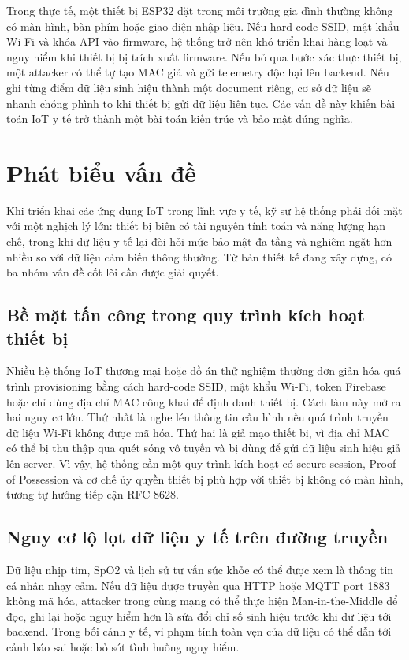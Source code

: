 \documentclass[a4paper,13pt,3p,oneside]{report}
\begin{document}
Trong thực tế, một thiết bị ESP32 đặt trong môi trường gia đình thường không có màn hình, bàn phím hoặc giao diện nhập liệu. Nếu hard-code SSID, mật khẩu Wi-Fi và khóa API vào firmware, hệ thống trở nên khó triển khai hàng loạt và nguy hiểm khi thiết bị bị trích xuất firmware. Nếu bỏ qua bước xác thực thiết bị, một attacker có thể tự tạo MAC giả và gửi telemetry độc hại lên backend. Nếu ghi từng điểm dữ liệu sinh hiệu thành một document riêng, cơ sở dữ liệu sẽ nhanh chóng phình to khi thiết bị gửi dữ liệu liên tục. Các vấn đề này khiến bài toán IoT y tế trở thành một bài toán kiến trúc và bảo mật đúng nghĩa.

\section{Phát biểu vấn đề}
Khi triển khai các ứng dụng IoT trong lĩnh vực y tế, kỹ sư hệ thống phải đối mặt với một nghịch lý lớn: thiết bị biên có tài nguyên tính toán và năng lượng hạn chế, trong khi dữ liệu y tế lại đòi hỏi mức bảo mật đa tầng và nghiêm ngặt hơn nhiều so với dữ liệu cảm biến thông thường. Từ bản thiết kế đang xây dựng, có ba nhóm vấn đề cốt lõi cần được giải quyết.

\subsection{Bề mặt tấn công trong quy trình kích hoạt thiết bị}
Nhiều hệ thống IoT thương mại hoặc đồ án thử nghiệm thường đơn giản hóa quá trình provisioning bằng cách hard-code SSID, mật khẩu Wi-Fi, token Firebase hoặc chỉ dùng địa chỉ MAC công khai để định danh thiết bị. Cách làm này mở ra hai nguy cơ lớn. Thứ nhất là nghe lén thông tin cấu hình nếu quá trình truyền dữ liệu Wi-Fi không được mã hóa. Thứ hai là giả mạo thiết bị, vì địa chỉ MAC có thể bị thu thập qua quét sóng vô tuyến và bị dùng để gửi dữ liệu sinh hiệu giả lên server. Vì vậy, hệ thống cần một quy trình kích hoạt có secure session, Proof of Possession và cơ chế ủy quyền thiết bị phù hợp với thiết bị không có màn hình, tương tự hướng tiếp cận RFC 8628.

\subsection{Nguy cơ lộ lọt dữ liệu y tế trên đường truyền}
Dữ liệu nhịp tim, SpO2 và lịch sử tư vấn sức khỏe có thể được xem là thông tin cá nhân nhạy cảm. Nếu dữ liệu được truyền qua HTTP hoặc MQTT port 1883 không mã hóa, attacker trong cùng mạng có thể thực hiện Man-in-the-Middle để đọc, ghi lại hoặc nguy hiểm hơn là sửa đổi chỉ số sinh hiệu trước khi dữ liệu tới backend. Trong bối cảnh y tế, vi phạm tính toàn vẹn của dữ liệu có thể dẫn tới cảnh báo sai hoặc bỏ sót tình huống nguy hiểm.
\end{document}
